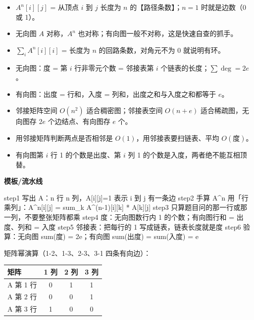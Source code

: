 \documentclass[10pt,a4paper]{ctexart}
\begin{document}
\begin{itemize}

\item $A^n[i][j]$ = 从顶点 $i$ 到 $j$ 长度为 $n$ 的【路径条数】；$n=1$ 时就是边数（0 或 1）。

\item 无向图 $A$ 对称，$A^n$ 也对称；有向图一般不对称，这是快速自查的抓手。

\item $\sum_i A^n[i][i]$ = 长度为 $n$ 的回路条数，对角元不为 0 就说明有环。

\item 无向图：度 = 第 $i$ 行非零元个数 = 邻接表第 $i$ 个链表的长度；$\sum \deg=2e$。

\item 有向图：出度 = 行和，入度 = 列和，出度之和与入度之和都等于 $e$。

\item 邻接矩阵空间 $O(n^2)$ 适合稠密图；邻接表空间 $O(n+e)$ 适合稀疏图，无向图存 $2e$ 个边结点、有向图存 $e$ 个。

\item 用邻接矩阵判断两点是否相邻是 $O(1)$，用邻接表要扫链表、平均 $O(\text{度})$。

\item 有向图第 $i$ 行 1 的个数是出度、第 $i$ 列 1 的个数是入度，两者绝不能互相顶替。

\end{itemize}


\textbf{模板/流水线}

\begin{codebox}
step1  写出 A：n 行 n 列，A[i][j]=1 表示 i 到 j 有一条边
step2  手算 A^n 用「行乘列」：A^n[i][j] = sum_k A^(n-1)[i][k] * A[k][j]
step3  只算题目问的那一行或那一列，不要整张矩阵都乘
step4  度：无向图数行内 1 的个数；有向图行和 = 出度、列和 = 入度
step5  邻接表：把每行的 1 写成链表，链表长度就是度
step6  验算：无向图 sum(度) = 2e；有向图 sum(出度) = sum(入度) = e
\end{codebox}

矩阵幂演算（1-2、1-3、2-3、3-1 四条有向边）：

\begin{center}\small
\begin{tabularx}{\linewidth}{@{}>{\raggedright\arraybackslash}Xccc@{}}
\toprule
矩阵 & 1 列 & 2 列 & 3 列 \\
\midrule
A 第 1 行 & 0 & 1 & 1 \\
A 第 2 行 & 0 & 0 & 1 \\
A 第 3 行 & 1 & 0 & 0 \\
\bottomrule
\end{tabularx}
\end{center}
\end{document}
